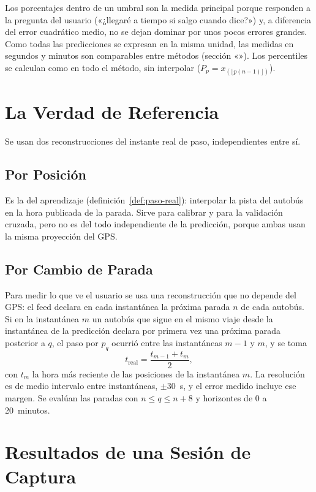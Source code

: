\noindent Los porcentajes dentro de un umbral son la medida principal porque responden a la pregunta del usuario
(«¿llegaré a tiempo si salgo cuando dice?») y, a diferencia del error cuadrático medio, no se dejan dominar por unos
pocos errores grandes. Como todas las predicciones se expresan en la misma unidad, las medidas en segundos y minutos son
comparables entre métodos (sección «»). Los percentiles se calculan como en todo el método, sin interpolar
($P_p=x_{(\lfloor p(n-1)\rfloor)}$).

\section{La Verdad de Referencia}
\label{sec:verdad}

Se usan dos reconstrucciones del instante real de paso, independientes entre sí.

\subsection{Por Posición} Es la del aprendizaje (definición~\ref{def:paso-real}): interpolar la pista del autobús en
la hora publicada de la parada. Sirve para calibrar y para la validación cruzada, pero no es del todo independiente de
la predicción, porque ambas usan la misma proyección del GPS.

\subsection{Por Cambio de Parada} Para medir lo que ve el usuario se usa una reconstrucción que no depende del GPS: el
feed declara en cada instantánea la próxima parada $n$ de cada autobús. Si en la instantánea $m$ un autobús que sigue
en el mismo viaje desde la instantánea de la predicción declara por primera vez una próxima parada posterior a $q$,
el paso por $p_q$ ocurrió entre las instantáneas $m-1$ y $m$, y se toma
\begin{equation}
\label{eq:verdad}
t_{\mathrm{real}}=\frac{t_{m-1}+t_m}{2},
\end{equation}
con $t_m$ la hora más reciente de las posiciones de la instantánea $m$. La resolución es de medio intervalo entre
instantáneas, $\pm30$~s, y el error medido incluye ese margen. Se evalúan las paradas con $n\le q\le n+8$ y horizontes
de 0 a 20~minutos.

\section{Resultados de una Sesión de Captura}
\label{sec:resultados}

